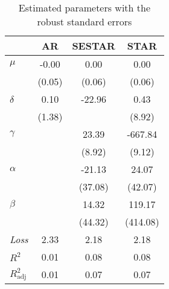 \begin{table}[htbp]
\centering
\caption{Estimated parameters with the robust standard errors}
\begin{tabular}{lccc}
\toprule
 & AR & SESTAR & STAR \\
\midrule
$\mu$ & -0.00 & 0.00 & 0.00 \\
 & (0.05) & (0.06) & (0.06) \\
$\delta$ & 0.10 & -22.96 & 0.43 \\
 & (1.38) &  & (8.92) \\
$\gamma$ &  & 23.39 & -667.84 \\
 &  & (8.92) & (9.12) \\
$\alpha$ &  & -21.13 & 24.07 \\
 &  & (37.08) & (42.07) \\
$\beta$ &  & 14.32 & 119.17 \\
 &  & (44.32) & (414.08) \\
\addlinespace
\emph{Loss} & 2.33 & 2.18 & 2.18 \\
$R^2$ & 0.01 & 0.08 & 0.08 \\
$R^2_{\text{adj}}$ & 0.01 & 0.07 & 0.07 \\
\bottomrule
\end{tabular}
\end{table}